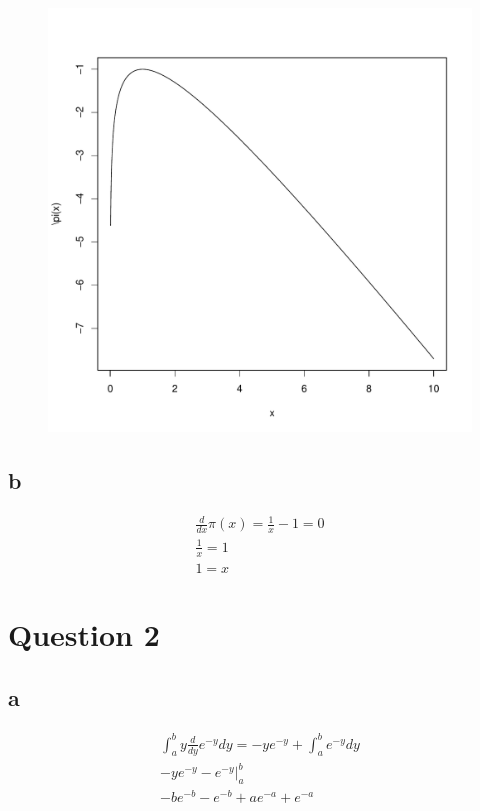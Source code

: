 \documentclass[10pt,letterpaper]{paper}
\begin{document}
  

\begin{figure}[H]
  \centering
  \includegraphics[scale=.25]{Question1c.pdf}
  \caption{\label{fig:label} }
\end{figure}


\subsection*{b}
\begin{align*}
  \frac{d}{dx} \pi(x) = \frac{1}{x} - 1 = 0\\
  \frac{1}{x} = 1\\
  1 = x
\end{align*}

\section*{Question 2}
\subsection*{a}
\begin{align*}
  \int_a^b y \frac{d}{dy} e^{ -y}dy = -y e^{ -y} + \int_a^b e^{-y}dy\\
  -y e^{ -y} - e^{ -y} \big |_a^b \\
  -b e^{ -b } - e^{ -b } + a e^{ -a } + e^{ -a }
\end{align*}
\end{document}

